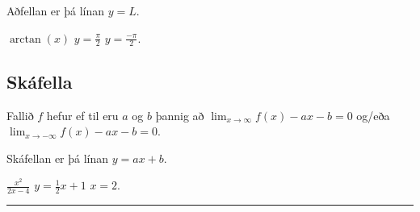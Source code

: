 \documentclass[b5paper,10pt,icelandic]{sphinxmanual}
\begin{document}
Aðfellan er þá línan \(y=L\).


 \(\arctan(x)\)  \(y=\frac{\pi}{2}\)  \(y=\frac{-\pi}{2}\).


\subsection{Skáfella}
\label{\detokenize{kafli05:skafella}}
Fallið \(f\) hefur  ef til eru \(a\) og \(b\)
þannig að \(\lim_{x\to \infty} f(x) -ax-b = 0\) og/eða
\(\lim_{x\to -\infty} f(x) -ax-b= 0\).

Skáfellan er þá línan \(y=ax+b\).


 \(\frac{x^2}{2x-4}\)  \(y=\frac{1}{2}x+1\)  \(x=2\).


\bigskip\hrule\bigskip


\newpage
\end{document}
